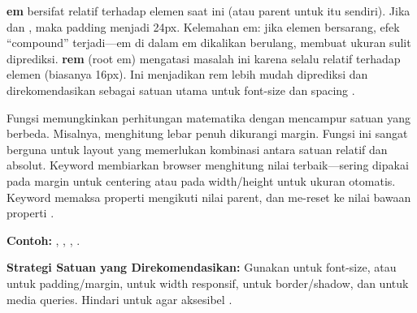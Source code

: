 \textbf{em} bersifat relatif terhadap  elemen saat ini (atau parent untuk  itu sendiri). Jika  dan , maka padding menjadi 24px. Kelemahan em: jika elemen bersarang, efek ``compound'' terjadi---em di dalam em dikalikan berulang, membuat ukuran sulit diprediksi. \textbf{rem} (root em) mengatasi masalah ini karena selalu relatif terhadap  elemen  (biasanya 16px). Ini menjadikan rem lebih mudah diprediksi dan direkomendasikan sebagai satuan utama untuk font-size dan spacing \cite{cssTricks}.

Fungsi  memungkinkan perhitungan matematika dengan mencampur satuan yang berbeda. Misalnya,  menghitung lebar penuh dikurangi margin. Fungsi ini sangat berguna untuk layout yang memerlukan kombinasi antara satuan relatif dan absolut. Keyword  membiarkan browser menghitung nilai terbaik---sering dipakai pada margin untuk centering atau pada width/height untuk ukuran otomatis. Keyword  memaksa properti mengikuti nilai parent, dan  me-reset ke nilai bawaan properti \cite{mdnCss}.

\textbf{Contoh:} , , , .

\begin{konsep}
\textbf{Strategi Satuan yang Direkomendasikan:} Gunakan  untuk font-size,  atau  untuk padding/margin, \code{\%} untuk width responsif,  untuk border/shadow, dan  untuk media queries. Hindari  untuk  agar aksesibel \cite{webdevCss}.
\end{konsep}

